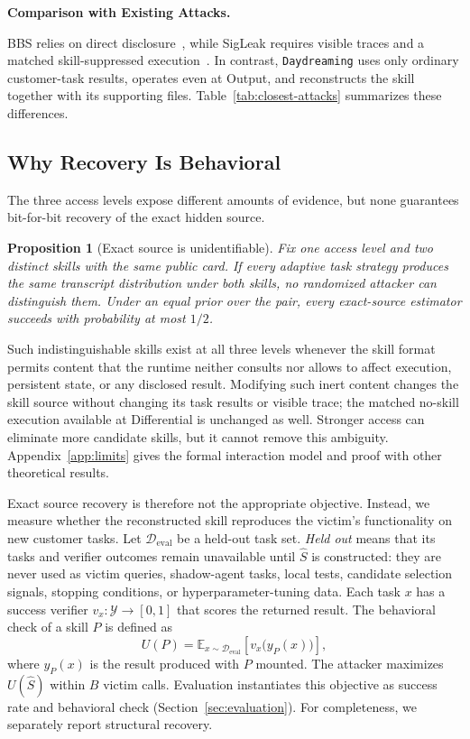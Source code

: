 \documentclass[letterpaper,twocolumn,10pt]{article}
\newcommand{\method}{\texttt{Daydreaming}\xspace}
\newtheorem{proposition}{Proposition}[section]
\newcommand{\paragraphtitle}[1]{%
  \vspace{5pt}\noindent\textbf{#1.}%
}
\begin{document}
\paragraphtitle{Comparison with Existing Attacks}
BBS relies on direct disclosure~\cite{wang2026blackboxskill}, while SigLeak requires visible traces and a matched skill-suppressed execution~\cite{geng2026agentskills}. In contrast, \method uses only ordinary customer-task results, operates even at Output, and reconstructs the skill together with its supporting files. Table~\ref{tab:closest-attacks} summarizes these differences.


\subsection{Why Recovery Is Behavioral}
\label{sec:goal}

The three access levels expose different amounts of evidence, but none guarantees bit-for-bit recovery of the exact hidden source.

\begin{proposition}[Exact source is unidentifiable]
\label{prop:nonident}
Fix one access level and two distinct skills with the same public card.  If
every adaptive task strategy produces the same transcript distribution under
both skills, no randomized attacker can distinguish them.  Under an equal
prior over the pair, every exact-source estimator succeeds with probability at
most $1/2$.
\end{proposition}

Such indistinguishable skills exist at all three levels whenever the skill format permits content
that the runtime neither consults nor allows to affect execution, persistent
state, or any disclosed result.  Modifying such inert content changes the skill source 
without changing its task results or visible  trace; the matched no-skill execution available at Differential is unchanged as
well.  Stronger access can eliminate more candidate skills, but it cannot remove
this ambiguity.  Appendix~\ref{app:limits} gives the formal interaction model and 
proof with other theoretical results.


Exact source recovery is therefore not the appropriate objective. Instead, we measure whether the reconstructed skill reproduces the victim's functionality on new customer tasks.
Let
$\mathcal{D}_{\mathrm{eval}}$ be a held-out task set.  \emph{Held out} means that
its tasks and verifier outcomes remain unavailable until $\widehat{S}$ is constructed:
they are never used as victim queries, shadow-agent tasks, local tests, candidate
selection signals, stopping conditions, or hyperparameter-tuning data.  Each task
$x$ has a success verifier $v_x:\mathcal{Y}\rightarrow[0,1]$ that scores the returned result.  The behavioral check of a skill
$P$ is defined as
\begin{equation}
  U(P)=\mathbb{E}_{x\sim\mathcal{D}_{\mathrm{eval}}}
  \left[v_x\bigl(y_P(x)\bigr)\right],
  \label{eq:behavioral-utility}
\end{equation}
where $y_P(x)$ is the result produced with $P$ mounted.  The attacker maximizes
$U(\widehat{S})$ within $B$ victim calls. Evaluation instantiates this objective as success rate and behavioral check (Section~\ref{sec:evaluation}).
For completeness, we separately report structural recovery. 
\end{document}
